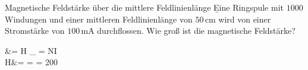 \begin{frame} 
	\begin{bsp}{Magnetische Feldstärke über die mittlere Feldlinienlänge}{}
		\b{Eine Ringspule mit $1000$ Windungen und einer mittleren Feldlinienlänge von $50\,\mathrm{cm}$ wird von einer Stromstärke von $100\,\mathrm{mA}$ durchflossen. Wie groß ist die magnetische Feldstärke?}%
		\begin{eqa}
			\varTheta &= H \cdot \ell_{} = N\cdot I\nonumber\\
			\onslide<3->H&=
			\onslide<4->= = 200\,\nonumber
			\onslide<1->
		\end{eqa}
	\end{bsp}
	

\end{frame}
